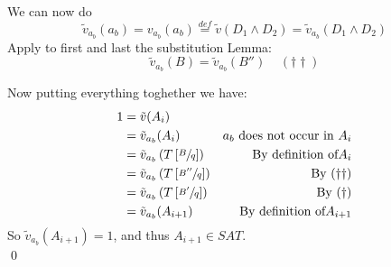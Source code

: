 	\noindent
	We can now do
	$$ \tilde v_{a_b} (a_b) = v_{a_b} (a_b) \stackrel{def}{=} \tilde v (D_1 \wedge D_2) = \tilde v_{a_b} (D_1 \wedge D_2)$$ 
	Apply to first and last the substitution Lemma:
	$$ \tilde v_{a_b} (B) = \tilde v_{a_b} (B'') \;\;\;\;(\dag \dag)$$

	\noindent
	Now putting everything toghether we have:
	\begin{align*}
		1 & = \tilde v (A_i) \\
		& = \tilde v_{a_b} (A_i) & a_b \text{ does not occur in } A_i\\
		& = \tilde v_{a_b} \left(T\left[\sfrac{B}{q}\right]\right) & \text{By definition of} A_i\\
		& = \tilde v_{a_b} \left(T\left[\sfrac{B''}{q}\right]\right) & \text{By } (\dag \dag) \\
		& = \tilde v_{a_b}  \left(T\left[\sfrac{B'}{q}\right]\right) & \text{By } (\dag) \\
		& = \tilde v_{a_b} (A_{i+1}) & \text{By definition of} A_{i+1}
	\end{align*}
	So $\tilde v_{a_b} (A_{i+1}) = 1$, and thus $A_{i+1} \in SAT$.\\
	\qed


